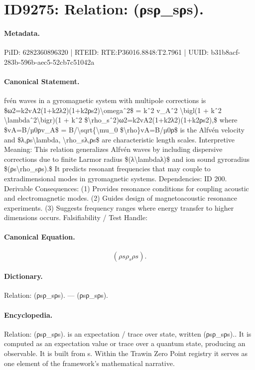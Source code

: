 \section*{ID9275: Relation: (ρsρ\_sρs).}
\paragraph{Metadata.}
PiID: 6282360896320 | RTEID: RTE:P36016.8848:T2.7961 | UUID: b31b8acf-283b-596b-aec5-52cb7c51042a

\paragraph{Canonical Statement.}
fvén waves in a gyromagnetic system with multipole corrections is \$ω2=k2vA2(1+k2λ2)(1+k2ρs2)\textbackslash{}omegaˆ2\$ = kˆ2 v\_Aˆ2 \textbackslash{}bigl(1 + kˆ2 \textbackslash{}lambdaˆ2\textbackslash{}bigr)(1 + kˆ2 \$\textbackslash{}rho\_sˆ2)ω2=k2vA2(1+k2λ2)(1+k2ρs2),\$ where \$vA=B/µ0ρv\_A\$ = B/\textbackslash{}sqrt\{\textbackslash{}mu\_0 \$\textbackslash{}rho\}vA=B/µ0ρ\$ is the Alfvén velocity and \$λ,ρs\textbackslash{}lambda, \textbackslash{}rho\_sλ,ρs\$ are characteristic length scales. Interpretive Meaning: This relation generalizes Alfvén waves by including dispersive corrections due to finite Larmor radius \$(λ\textbackslash{}lambdaλ)\$ and ion sound gyroradius \$(ρs\textbackslash{}rho\_sρs).\$ It predicts resonant frequencies that may couple to extradimensional modes in gyromagnetic systems. Dependencies: ID 200. Derivable Consequences: (1) Provides resonance conditions for coupling acoustic and electromagnetic modes. (2) Guides design of magnetoacoustic resonance experiments. (3) Suggests frequency ranges where energy transfer to higher dimensions occurs. Falsifiability / Test Handle:

\paragraph{Canonical Equation.}
\[
(ρs\rho_sρs).
\]

\paragraph{Dictionary.}
Relation: (ρsρ\_sρs). — (ρsρ\_sρs).

\paragraph{Encyclopedia.}
Relation: (ρsρ\_sρs). is an expectation / trace over state, written (ρsρ\_sρs).. It is computed as an expectation value or trace over a quantum state, producing an observable. It is built from s. Within the Trawin Zero Point registry it serves as one element of the framework's mathematical narrative.
